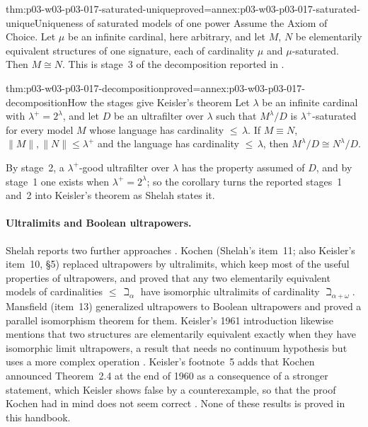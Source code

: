 \begin{hbtheorem}{thm:p03-w03-p03-017-saturated-unique}{proved=annex:p03-w03-p03-017-saturated-unique}{Uniqueness of saturated models of one power}
Assume the Axiom of Choice.  Let \(\mu\) be an infinite cardinal, here
arbitrary, and let \(M\), \(N\) be elementarily equivalent structures of one
signature, each of cardinality \(\mu\) and \(\mu\)-saturated.  Then
\(M\cong N\).  This is stage~3 of the decomposition reported in
\cite[p.~224]{Shelah1971Ultrapowers}.
\end{hbtheorem}

\begin{hbcorollary}{thm:p03-w03-p03-017-decomposition}{proved=annex:p03-w03-p03-017-decomposition}{How the stages give Keisler's theorem}
Let \(\lambda\) be an infinite cardinal with \(\lambda^+=2^\lambda\), and let
\(D\) be an ultrafilter over \(\lambda\) such that \(M^\lambda/D\) is
\(\lambda^+\)-saturated for every model \(M\) whose language has cardinality
\({\le}\,\lambda\).  If \(M\equiv N\), \(\lVert M\rVert,\lVert N\rVert\le
\lambda^+\) and the language has cardinality \({\le}\,\lambda\), then
\(M^\lambda/D\cong N^\lambda/D\).
\end{hbcorollary}

By stage~2, a \(\lambda^+\)-good ultrafilter over \(\lambda\) has the
property assumed of \(D\), and by stage~1 one exists when
\(\lambda^+=2^\lambda\); so the corollary turns the reported stages~1 and~2
into Keisler's theorem as Shelah states it.

\paragraph{Ultralimits and Boolean ultrapowers.}  Shelah reports two further
approaches \cite[pp.~224--225]{Shelah1971Ultrapowers}.  Kochen (Shelah's
item~11; also Keisler's item~10, \S5) replaced ultrapowers by ultralimits,
which keep most of the useful properties of ultrapowers, and proved that any
two elementarily equivalent models of cardinalities \({\le}\,\beth_\alpha\)
have isomorphic ultralimits of cardinality \(\beth_{\alpha+\omega}\).
Mansfield (item~13) generalized ultrapowers to Boolean ultrapowers and proved
a parallel isomorphism theorem for them.  Keisler's 1961 introduction
likewise mentions that two structures are elementarily equivalent exactly
when they have isomorphic limit ultrapowers, a result that needs no
continuum hypothesis but uses a more complex operation
\cite[p.~478]{Keisler1961ElementaryClasses}.  Keisler's footnote~5 adds
that Kochen announced Theorem~2.4 at the end of 1960 as a consequence of a
stronger statement, which Keisler shows false by a counterexample, so that
the proof Kochen had in mind does not seem correct
\cite[p.~487, footnote~5]{Keisler1961ElementaryClasses}.  None of these
results is proved in this handbook.


